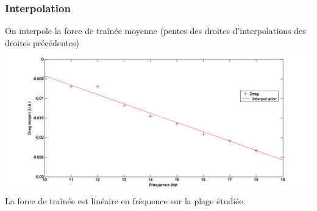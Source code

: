 \documentclass{beamer}
\begin{document}
 	\begin{frame}
 		\frametitle{Interpolation}
 		On interpole la force de traînée moyenne (pentes des droites d'interpolations des droites précédentes)
 		\centering \includegraphics[width= 0.8 \linewidth]{modulationfreq.png} \\
 		La force de traînée est linéaire en fréquence sur la plage étudiée.
 	\end{frame}
\end{document}
